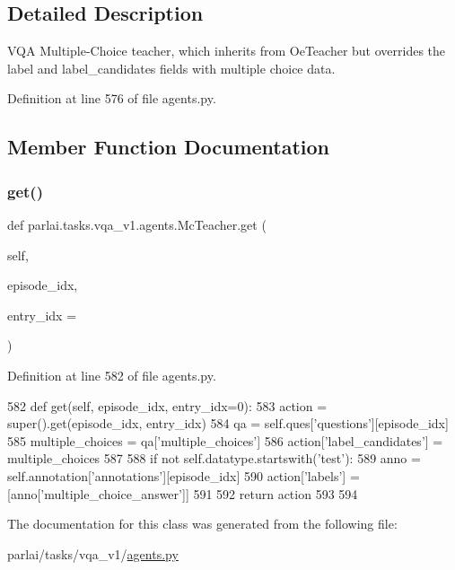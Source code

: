 \subsection{Detailed Description}
\begin{DoxyVerb}VQA Multiple-Choice teacher, which inherits from OeTeacher but overrides the label
and label_candidates fields with multiple choice data.
\end{DoxyVerb}
 

Definition at line 576 of file agents.\+py.



\subsection{Member Function Documentation}
\mbox{\label{classparlai_1_1tasks_1_1vqa__v1_1_1agents_1_1McTeacher_acfe24f89d048cb6e8ccd745838223f07}} 
\subsubsection{\texorpdfstring{get()}{get()}}
{\footnotesize\ttfamily def parlai.\+tasks.\+vqa\+\_\+v1.\+agents.\+Mc\+Teacher.\+get (\begin{DoxyParamCaption}\item[{}]{self,  }\item[{}]{episode\+\_\+idx,  }\item[{}]{entry\+\_\+idx = {} }\end{DoxyParamCaption})}



Definition at line 582 of file agents.\+py.


\begin{DoxyCode}
582     \textcolor{keyword}{def }get(self, episode\_idx, entry\_idx=0):
583         action = super().get(episode\_idx, entry\_idx)
584         qa = self.ques[\textcolor{stringliteral}{'questions'}][episode\_idx]
585         multiple\_choices = qa[\textcolor{stringliteral}{'multiple\_choices'}]
586         action[\textcolor{stringliteral}{'label\_candidates'}] = multiple\_choices
587 
588         \textcolor{keywordflow}{if} \textcolor{keywordflow}{not} self.datatype.startswith(\textcolor{stringliteral}{'test'}):
589             anno = self.annotation[\textcolor{stringliteral}{'annotations'}][episode\_idx]
590             action[\textcolor{stringliteral}{'labels'}] = [anno[\textcolor{stringliteral}{'multiple\_choice\_answer'}]]
591 
592         \textcolor{keywordflow}{return} action
593 
594 
\end{DoxyCode}


The documentation for this class was generated from the following file\+:\begin{DoxyCompactItemize}
\item 
parlai/tasks/vqa\+\_\+v1/\hyperlink{parlai_2tasks_2vqa__v1_2agents_8py}{agents.\+py}\end{DoxyCompactItemize}
